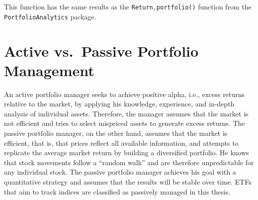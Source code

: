 \documentclass[
  oneside, a4paper, 12pt, openany]{book}
\newenvironment{Shaded}{\begin{snugshade}}{\end{snugshade}}
\newcommand{\AttributeTok}[1]{\textcolor[rgb]{0.77,0.63,0.00}{#1}}
\newcommand{\ControlFlowTok}[1]{\textcolor[rgb]{0.13,0.29,0.53}{\textbf{#1}}}
\newcommand{\DecValTok}[1]{\textcolor[rgb]{0.00,0.00,0.81}{#1}}
\newcommand{\FunctionTok}[1]{\textcolor[rgb]{0.00,0.00,0.00}{#1}}
\newcommand{\NormalTok}[1]{#1}
\newcommand{\OtherTok}[1]{\textcolor[rgb]{0.56,0.35,0.01}{#1}}
\newcommand{\SpecialCharTok}[1]{\textcolor[rgb]{0.00,0.00,0.00}{#1}}
\newcommand{\StringTok}[1]{\textcolor[rgb]{0.31,0.60,0.02}{#1}}
\theoremstyle{definition}
\theoremstyle{definition}
\theoremstyle{definition}
\theoremstyle{definition}
\theoremstyle{remark}
\begin{document}
\begin{Shaded}
\end{Shaded}

\normalsize\vspace{0.1cm}

This function has the same results as the \texttt{Return.portfolio()} function from the \texttt{PortfolioAnalytics} package.

\hypertarget{activevspassive}{%
\chapter{Active vs.~Passive Portfolio Management}\label{activevspassive}}

An active portfolio manager seeks to achieve positive alpha, i.e., excess returns relative to the market, by applying his knowledge, experience, and in-depth analysis of individual assets. Therefore, the manager assumes that the market is not efficient and tries to select mispriced assets to generate excess returns. The passive portfolio manager, on the other hand, assumes that the market is efficient, that is, that prices reflect all available information, and attempts to replicate the average market return by building a diversified portfolio. He knows that stock movements follow a ``random walk'' and are therefore unpredictable for any individual stock. The passive portfolio manager achieves his goal with a quantitative strategy and assumes that the results will be stable over time. ETFs that aim to track indices are classified as passively managed in this thesis.
\end{document}
